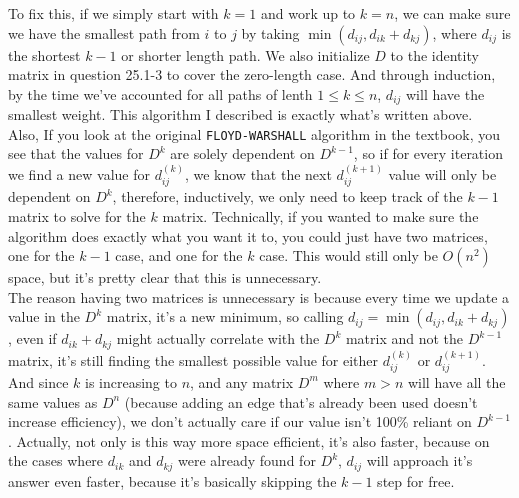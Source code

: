 \documentclass[11pt]{article}
\begin{document}
 To fix this, if we simply start with \(k=1\) and work up to \(k=n\), we can make sure we have the 
 smallest path from \(i\) to \(j\) by taking \(\min(d_{ij}, d_{ik} + d_{kj})\), where \(d_{ij}\) is 
 the shortest \(k-1\) or shorter length path.  We also initialize \(D\) to the identity matrix in 
 question 25.1-3 to cover the zero-length case.  And through induction, by the time we've accounted 
 for all paths of lenth \(1 \leq k \leq n\), \(d_{ij}\) will have the smallest weight.  This 
 algorithm I described is exactly what's written above.  \\

 Also, If you look at the original \texttt{FLOYD-WARSHALL} algorithm in the textbook, you see that 
 the values for \(D^k\) are solely dependent on \(D^{k-1}\), so if for every iteration we find a new 
 value for \(d^{(k)}_{ij}\), we know that the next \(d^{(k+1)}_{ij}\) value will only be dependent 
 on \(D^k\), therefore, inductively, we only need to keep track of the \(k-1\) matrix to solve for 
 the \(k\) matrix.
 \newpage
 Technically, if you wanted to make sure the algorithm does exactly what you want it to, you could 
 just have two matrices, one for the \(k-1\) case, and one for the \(k\) case.  This would still 
 only be \(O(n^2)\) space, but it's pretty clear that this is unnecessary. \\ 

 The reason having two matrices is unnecessary is because every time we update a value in the \(D^k\) 
 matrix, it's a new minimum, so calling \(d_{ij} = \min(d_{ij}, d_{ik} + d_{kj})\), even if 
 \(d_{ik} + d_{kj}\) might actually correlate with the \(D^k\) matrix and not the \(D^{k-1}\) matrix, 
 it's still finding the smallest possible value for either \(d^{(k)}_{ij}\) or \(d^{(k+1)}_{ij}\). 
 And since \(k\) is increasing to \(n\), and any matrix \(D^m\) where \(m>n\) will have all the same 
 values as \(D^n\) (because adding an edge that's already been used doesn't increase efficiency), we 
 don't actually care if our value isn't 100\% reliant on \(D^{k-1}\).  Actually, not only is this 
 way more space efficient, it's also faster, because on the cases where \(d_{ik}\) and \(d_{kj}\) 
 were already found for \(D^k\), \(d_{ij}\) will approach it's answer even faster, because it's 
 basically skipping the \(k-1\) step for free.
\end{document}
